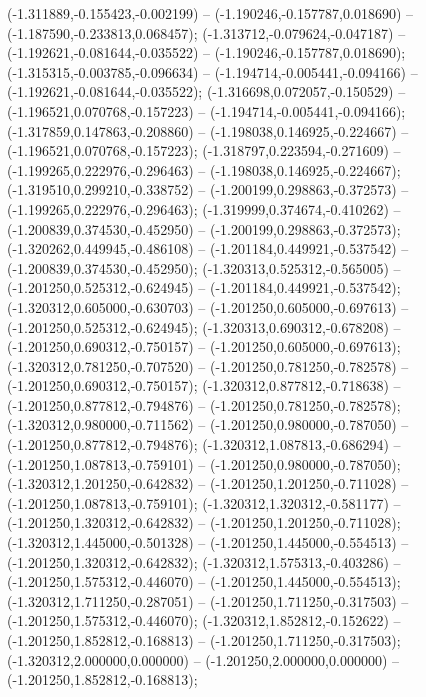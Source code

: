  (-1.311889,-0.155423,-0.002199) -- (-1.190246,-0.157787,0.018690) -- (-1.187590,-0.233813,0.068457);
 (-1.313712,-0.079624,-0.047187) -- (-1.192621,-0.081644,-0.035522) -- (-1.190246,-0.157787,0.018690);
 (-1.315315,-0.003785,-0.096634) -- (-1.194714,-0.005441,-0.094166) -- (-1.192621,-0.081644,-0.035522);
 (-1.316698,0.072057,-0.150529) -- (-1.196521,0.070768,-0.157223) -- (-1.194714,-0.005441,-0.094166);
 (-1.317859,0.147863,-0.208860) -- (-1.198038,0.146925,-0.224667) -- (-1.196521,0.070768,-0.157223);
 (-1.318797,0.223594,-0.271609) -- (-1.199265,0.222976,-0.296463) -- (-1.198038,0.146925,-0.224667);
 (-1.319510,0.299210,-0.338752) -- (-1.200199,0.298863,-0.372573) -- (-1.199265,0.222976,-0.296463);
 (-1.319999,0.374674,-0.410262) -- (-1.200839,0.374530,-0.452950) -- (-1.200199,0.298863,-0.372573);
 (-1.320262,0.449945,-0.486108) -- (-1.201184,0.449921,-0.537542) -- (-1.200839,0.374530,-0.452950);
 (-1.320313,0.525312,-0.565005) -- (-1.201250,0.525312,-0.624945) -- (-1.201184,0.449921,-0.537542);
 (-1.320312,0.605000,-0.630703) -- (-1.201250,0.605000,-0.697613) -- (-1.201250,0.525312,-0.624945);
 (-1.320313,0.690312,-0.678208) -- (-1.201250,0.690312,-0.750157) -- (-1.201250,0.605000,-0.697613);
 (-1.320312,0.781250,-0.707520) -- (-1.201250,0.781250,-0.782578) -- (-1.201250,0.690312,-0.750157);
 (-1.320312,0.877812,-0.718638) -- (-1.201250,0.877812,-0.794876) -- (-1.201250,0.781250,-0.782578);
 (-1.320312,0.980000,-0.711562) -- (-1.201250,0.980000,-0.787050) -- (-1.201250,0.877812,-0.794876);
 (-1.320312,1.087813,-0.686294) -- (-1.201250,1.087813,-0.759101) -- (-1.201250,0.980000,-0.787050);
 (-1.320312,1.201250,-0.642832) -- (-1.201250,1.201250,-0.711028) -- (-1.201250,1.087813,-0.759101);
 (-1.320312,1.320312,-0.581177) -- (-1.201250,1.320312,-0.642832) -- (-1.201250,1.201250,-0.711028);
 (-1.320312,1.445000,-0.501328) -- (-1.201250,1.445000,-0.554513) -- (-1.201250,1.320312,-0.642832);
 (-1.320312,1.575313,-0.403286) -- (-1.201250,1.575312,-0.446070) -- (-1.201250,1.445000,-0.554513);
 (-1.320312,1.711250,-0.287051) -- (-1.201250,1.711250,-0.317503) -- (-1.201250,1.575312,-0.446070);
 (-1.320312,1.852812,-0.152622) -- (-1.201250,1.852812,-0.168813) -- (-1.201250,1.711250,-0.317503);
 (-1.320312,2.000000,0.000000) -- (-1.201250,2.000000,0.000000) -- (-1.201250,1.852812,-0.168813);
